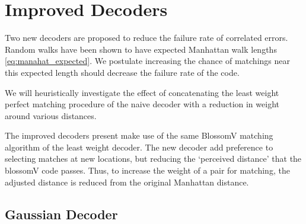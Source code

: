 	\section{Improved Decoders}
	Two new decoders are proposed to reduce the failure rate of correlated errors. Random walks have been shown to have expected Manhattan walk lengths \ref{eq:manahat_expected}. We postulate increasing the chance of matchings near this expected length should decrease the failure rate of the code. 
	
	We will heuristically investigate the effect of concatenating the least weight perfect matching procedure of the naive decoder with a reduction in weight around various distances.
	
	The improved decoders present make use of the same BlossomV matching algorithm of the least weight decoder. The new decoder add preference to selecting matches at new locations, but reducing the `perceived distance' that the blossomV code passes. Thus, to increase the weight of a pair for matching, the adjusted distance is reduced from the original Manhattan distance. 
	\subsection{Gaussian Decoder}
	
